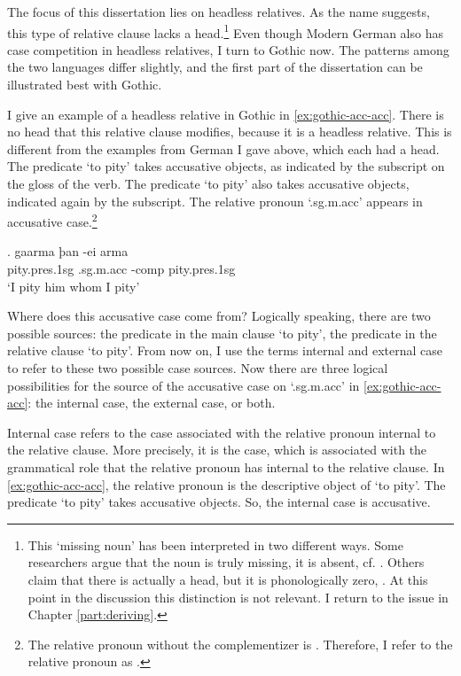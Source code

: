 The focus of this dissertation lies on headless relatives. As the name suggests, this type of relative clause lacks a head.\footnote{
This `missing noun' has been interpreted in two different ways. Some researchers argue that the noun is truly missing, it is absent, cf. \citealt{citko2005,vanriemsdijk2006}. Others claim that there is actually a head, but it is phonologically zero, \citealt{bresnan1978,groos1981,grosu2003}. At this point in the discussion this distinction is not relevant. I return to the issue in Chapter \ref{part:deriving}.
}
Even though Modern German also has case competition in headless relatives, I turn to Gothic now. The patterns among the two languages differ slightly, and the first part of the dissertation can be illustrated best with Gothic.

I give an example of a headless relative in Gothic in \ref{ex:gothic-acc-acc}.
There is no head that this relative clause modifies, because it is a headless relative. This is different from the examples from German I gave above, which each had a head.
The predicate  `to pity' takes accusative objects, as indicated by the subscript on the gloss of the verb. The predicate  `to pity' also takes accusative objects, indicated again by the subscript.
The relative pronoun  `.\ac{sg}.\ac{m}.\ac{acc}' appears in accusative case.\footnote{
The relative pronoun without the complementizer  is . Therefore, I refer to the relative pronoun as .
}

\exg. gaarma þan -ei arma\\
 pity.\ac{pres}.1\ac{sg}\scsub{[acc]} .\ac{sg}.\ac{m}.\ac{acc} -\ac{comp} pity.\ac{pres}.1\ac{sg}\scsub{[acc]}\\
 `I pity him whom I pity' \label{ex:gothic-acc-acc}

Where does this accusative case come from? Logically speaking, there are two possible sources: the predicate in the main clause  `to pity', the predicate in the relative clause  `to pity'. From now on, I use the terms internal and external case to refer to these two possible case sources. Now there are three logical possibilities for the source of the accusative case on  `.\ac{sg}.\ac{m}.\ac{acc}' in \ref{ex:gothic-acc-acc}: the internal case, the external case, or both.

Internal case refers to the case associated with the relative pronoun internal to the relative clause. More precisely, it is the case, which is associated with the grammatical role that the relative pronoun has internal to the relative clause. In \ref{ex:gothic-acc-acc}, the relative pronoun is the descriptive object of  `to pity'. The predicate  `to pity' takes accusative objects. So, the internal case is accusative.

